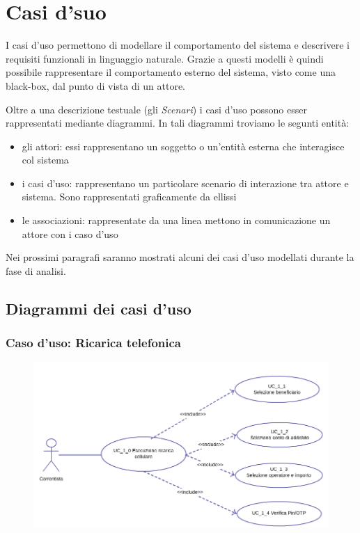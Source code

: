 \chapter{Casi d'suo}
I casi d'uso permettono di modellare il comportamento del sistema e descrivere i requisiti funzionali in linguaggio naturale. Grazie a questi modelli è quindi possibile rappresentare il comportamento esterno del sistema, visto come una black-box, dal punto di vista di un attore.

Oltre a una descrizione testuale (gli \emph{Scenari}) i casi d'uso possono esser rappresentati mediante diagrammi. In tali diagrammi troviamo le segunti entità:
 \begin{itemize}
  \item gli attori: essi rappresentano un soggetto o un'entità esterna che interagisce col sistema
  \item i casi d'uso: rappresentano un particolare scenario di interazione tra attore e sistema. Sono rappresentati graficamente da ellissi
  \item le associazioni: rappresentate da una linea mettono in comunicazione un attore con i caso d'uso
 \end{itemize}

 Nei prossimi paragrafi saranno mostrati alcuni dei casi d'uso modellati durante la fase di analisi.
 \section{Diagrammi dei casi d'uso}
 
 \subsection{Caso d'uso: Ricarica telefonica}
	\begin{figure}[!htbp]
	  \centering
	  \includegraphics[scale=0.60]{casi_uso/ricarica.png}
	\end{figure}
	
